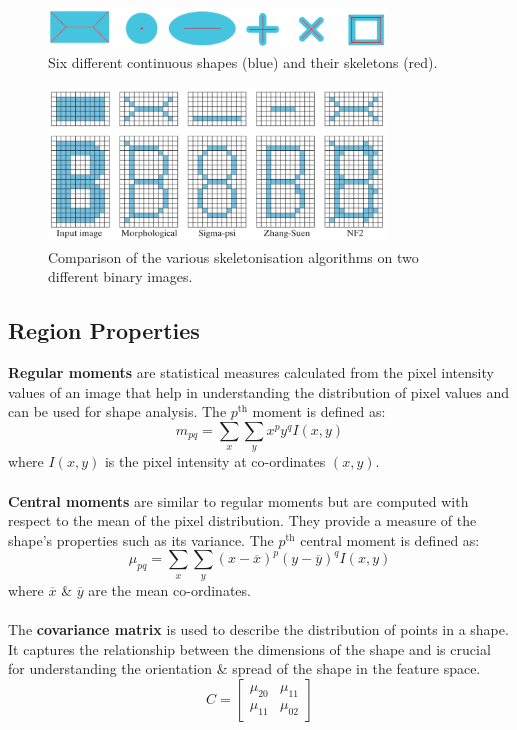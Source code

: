\documentclass[a4paper,11pt]{article}
\begin{document}
\begin{figure}[H]
    \centering
    \includegraphics[width=0.8\textwidth]{images/skeletonisationexamples.png}
    \caption{Six different continuous shapes (blue) and their skeletons (red).}
\end{figure}

\begin{figure}[H]
    \centering
    \includegraphics[width=0.8\textwidth]{images/skeletonisationalgorithms.png}
    \caption{Comparison of the various skeletonisation algorithms on two different binary images.}
\end{figure}

\subsection{Region Properties}
\textbf{Regular moments} are statistical measures calculated from the pixel intensity values of an image that help in understanding the distribution of pixel values and can be used for shape analysis.
The $p^\text{th}$ moment is defined as:
\[
    m_{pq} = \sum_x \sum_y x^p y^q I(x,y)
\]
where $I(x,y)$ is the pixel intensity at co-ordinates $(x,y)$.
\\\\
\textbf{Central moments} are similar to regular moments but are computed with respect to the mean of the pixel distribution.
They provide a measure of the shape's properties such as its variance.
The $p^\text{th}$ central moment is defined as:
\[
    \mu_{pq} = \sum_x \sum_y (x - \overline{x})^p (y - \overline{y})^q I(x,y)
\]
where $\overline{x}$ \& $\overline{y}$ are the mean co-ordinates.
\\\\
The \textbf{covariance matrix} is used to describe the distribution of points in a shape.
It captures the relationship between the dimensions of the shape and is crucial for understanding the orientation \& spread of the shape in the feature space.
\[
    C =
    \begin{bmatrix}
        \mu_{20} & \mu_{11} \\
        \mu_{11} & \mu_{02}
    \end{bmatrix}
\]
\end{document}
